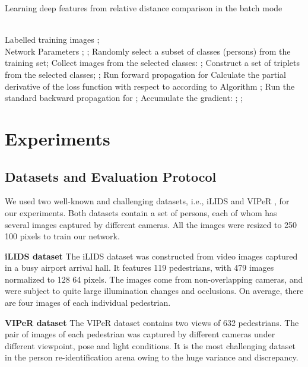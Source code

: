 \documentclass[review]{elsarticle}
\begin{document}
\begin{small}
\begin{algorithm}[htb]        
\caption{Learning deep features from relative distance comparison in the batch mode}            
\label{alg:batchTraining}                
\begin{algorithmic}[1]               
\REQUIRE ~~\\                         
   Labelled training images ;
\ENSURE ~~\\                          
	Network Parameters ;
\WHILE    {}
\STATE ;
\STATE Randomly select a subset of classes (persons) from the training set;
\STATE Collect images from the selected  classes:  ;
\STATE Construct a set of triplets from the selected classes;
\STATE ;
  \FORALL {}
\STATE Run forward propagation for 
\STATE Calculate the partial derivative of the loss function with respect to  according to Algorithm ;
\STATE Run the standard backward propagation for ;
\STATE Accumulate the gradient: ;
\ENDFOR
\STATE ;
\ENDWHILE          

\end{algorithmic}
\end{algorithm}
\end{small}





\section{Experiments}
\subsection{Datasets and Evaluation Protocol}
We used two well-known and challenging datasets, i.e., iLIDS \cite{iLIDS} and VIPeR  \cite{gray2008viewpoint}, for our experiments. Both datasets contain a set of persons, each of whom has several images captured by different cameras. All the images were resized to 250  100 pixels to train our network.

\textbf{iLIDS dataset} The iLIDS dataset \cite{iLIDS} was constructed from video images captured in a busy airport arrival hall. It features 119 pedestrians, with 479 images normalized to 128  64 pixels. The images come from non-overlapping cameras, and were subject to quite large illumination changes and occlusions. On average, there are four images of each individual pedestrian. 


\textbf{VIPeR dataset} The VIPeR dataset \cite{gray2008viewpoint} contains two views of 632 pedestrians. The pair of images of each pedestrian was captured by different cameras under different viewpoint, pose and light conditions. It is the most challenging dataset in the person re-identification arena owing to the huge variance and discrepancy. 
\end{document}
